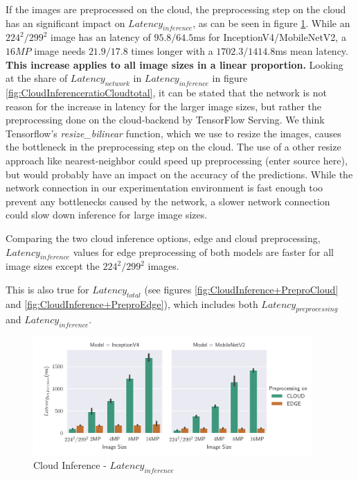 If the images are preprocessed on the cloud, the preprocessing step on the cloud has an significant impact on $Latency_{inference}$, as can be seen in figure \ref{fig:cloudInferenceInferenceLatency}.
While an $224^2/299^2$ image has an latency of $95.8/64.5$ms for InceptionV4/MobileNetV2, a $16MP$ image needs $21.9/17.8$ times longer with a $1702.3/1414.8$ms mean latency.
\textbf{This increase applies to all image sizes in a linear proportion.}
Looking at  the share of $Latency_{network}$ in $Latency_{inference}$ in figure \ref{fig:CloudInferenceratioCloudtotal}, it can be stated that the network is not reason for the increase in latency for the larger image sizes, but rather the preprocessing done on the cloud-backend by TensorFlow Serving.
We think Tensorflow's \emph{resize\_bilinear} function, which we use to resize the images, causes the bottleneck in the preprocessing step on the cloud.%
The use of a other resize approach like nearest-neighbor could speed up preprocessing (enter source here), but would probably have an impact on the accuracy of the predictions.
While the network connection in our experimentation environment is fast enough too prevent any bottlenecks caused by the network, a slower network connection could slow down inference for large image sizes.

Comparing the two cloud inference options, edge and cloud preprocessing,  $Latency_{inference}$ values for edge preprocessing of both models are faster for all image sizes except the $224^2/299^2$ images.


This is also true for $Latency_{total}$ (see figures \ref{fig:CloudInference+PreproCloud} and \ref{fig:CloudInference+PreproEdge}), which includes both $Latency_{preprocessing}$ and $Latency_{inference}$.


\begin{figure}[H]
\centering
\includegraphics[width=0.95\textwidth]{./Bilder/single_plots/cloud_inference_plots/Cloud_Inference_Latency.pdf}
\caption{Cloud Inference -  $Latency_{inference}$}
\label{fig:cloudInferenceInferenceLatency}
\end{figure}



